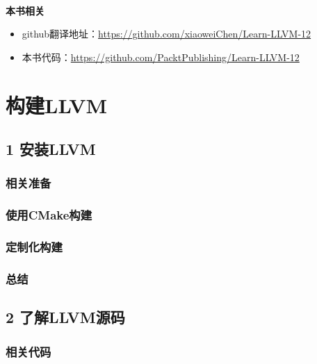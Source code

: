 \documentclass[11pt,a4paper,UTF8]{ctexart}
\begin{document}
	
	\hspace*{\fill} \\ %
	\noindent\textbf{本书相关}\ \par
	\begin{itemize}
		\item github翻译地址：\href{https://github.com/xiaoweiChen/Learn-LLVM-12}{https://github.com/xiaoweiChen/Learn-LLVM-12}
		\item 本书代码：\href{https://github.com/PacktPublishing/Learn-LLVM-12}{https://github.com/PacktPublishing/Learn-LLVM-12}
	\end{itemize}
	\newpage
	
	\tableofcontents
	\newpage
	
	\pagestyle{empty}
	

	\section{构建LLVM}
	
	\subsection{1 安装LLVM}
		\subsubsection{相关准备}
		\subsubsection{使用CMake构建}
		\subsubsection{定制化构建}
		\subsubsection{总结}
	\subsection{2 了解LLVM源码}
		\subsubsection{相关代码}
\end{document}
